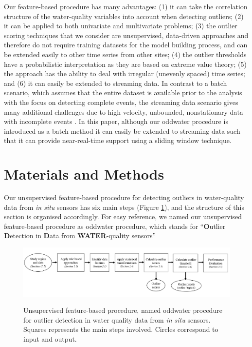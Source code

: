 \documentclass[draft]{agujournal2018} %
\begin{document}
 \color{black}Our feature-based procedure  \color{black} has many advantages: (1) it can take the correlation structure of the water-quality variables into account when
detecting outliers; (2) it can be applied to both univariate and
multivariate problems; (3) the outlier scoring techniques that we
consider are unsupervised, data-driven approaches and therefore do not
require training datasets for the model building process, and can be
extended easily to other time series from other sites; (4) the outlier
thresholds have a probabilistic interpretation as they are based on
extreme value theory; (5) the  \color{black} approach \color{black}  has the ability to deal with irregular (unevenly spaced) time series; and (6) \color{black} it can easily be extended to streaming data. In contrast to a batch scenario, which assumes that the entire dataset is available prior to the analysis with the focus on detecting complete events, the streaming data scenario gives many additional challenges due to high velocity, unbounded, nonstationary data with incomplete events \citep{hill2009real, talagala2018anomaly}. In this paper, although our oddwater procedure is introduced as a batch method it \color{black} can easily be extended to streaming data such that it can provide near-real-time support \color{black} using a sliding window technique. \color{black}

\section{Materials and Methods}\label{sec:methodology}

Our \color{black} unsupervised feature-based procedure \color{black} for detecting outliers in water-quality data from
\emph{in situ} sensors has six main steps (Figure
\ref{fig:frameworkwater}), and the structure of this section is organised
accordingly. \color{black} For easy reference, we named our unsupervised feature-based procedure as oddwater procedure, which stands for “\textbf{O}utlier \textbf{D}etection in \textbf{D}ata from \textbf{WATER}-quality sensors” \color{black}

\begin{figure}[H]

{\centering \includegraphics[width=1\linewidth]{./fig/framework}
}
\caption{\color{black} Unsupervised feature-based procedure, named oddwater procedure \color{black} for outlier detection in water quality data from \textit{in situ} sensors. Squares represents the main steps involved. Circles correspond to input and output. }\label{fig:frameworkwater}
\end{figure}
\end{document}
